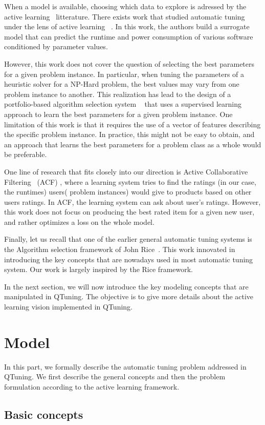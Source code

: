 \documentclass[10pt, conference, compsocconf]{IEEEtran}
\begin{document}
When a model is available, choosing which data to explore is adressed by the
active learning~\cite{DBLP:series/synthesis/2012Settles} litterature.
There exists work that studied automatic tuning under the lens of active learning
~\cite{DBLP:conf/cluster/BalaprakashGW13}. In this work, the authors build a
surrogate model that can predict the runtime and power consumption of various
software conditioned by parameter values.

However, this work does not cover the question of selecting the best parameters
for a given problem instance. In particular, when tuning the parameters of a
heuristic solver for a NP-Hard problem, the best values may vary from one
problem instance to another. This realization has lead to the design of a
portfolio-based algorithm selection system ~\cite{xu2008satzilla} that uses a
supervised learning approach to learn the best parameters for a given problem
instance.  One limitation of this work is that it requires the use of a vector
of features describing the specific problem instance. In practice, this might
not be easy to obtain, and an approach that learns the best parameters for a
problem class as a whole would be preferable.

One line of research that fits closely into our direction is Active
Collaborative Filtering~\cite{DBLP:journals/corr/abs-1212-2442} (ACF) , where a
learning system tries to find the ratings (in our case, the runtimes) users(
problem instances) would give to products based on other users ratings. In ACF,
the learning system can ask about user's ratings. However, this work
does not focus on producing the best rated item for a given new user, and rather
optimizes a loss on the whole model.

Finally, let us recall that one of the earlier general automatic tuning systems
is the  Algorithm selection framework of John Rice~\cite{Rice}. This work
innovated in introducing the key concepts that are nowadays used in most
automatic tuning system. Our work is largely inspired by the Rice framework.

In the next section, we will now introduce the key modeling concepts that are
manipulated in QTuning. The objective is to give more details about the active
learning vision implemented in QTuning.

\section{Model} \label{Model}

In this part, we formally describe the automatic tuning problem addressed in QTuning. We first describe 
the general concepts and then the problem formulation according to the active learning framework.
 \subsection{Basic concepts}
\end{document}
